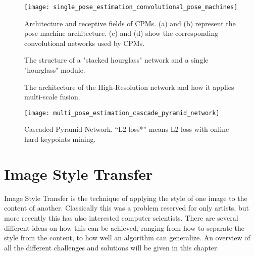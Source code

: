 \begin{figure}
	\centering
	\texttt{[image: single\_pose\_estimation\_convolutional\_pose\_machines]}%
	\caption{
		Architecture and receptive fields of \gls{CPMs}. (a) and (b) represent the pose machine architecture.\cite{Ramakrishna2014}
		(c) and (d) show the corresponding convolutional networks used by \gls{CPMs}.\cite{Wei2016}
	}
	\label{fig:convolutional_pose_machines}
\end{figure}

\begin{figure}
	\centering
	\caption{
		The structure of a "stacked hourglass" network and a single "hourglass" module.\cite{Newell2016}
	}
	\label{fig:stacked_hourglass}
\end{figure}

\begin{figure}
	\centering
	\caption{
		The architecture of the High-Resolution network and how it applies multi-scale fusion.\cite{Sun2019}
	}
	\label{fig:HRNet}
\end{figure}

\begin{figure}
	\centering
	\texttt{[image: multi\_pose\_estimation\_cascade\_pyramid\_network]}%
	\caption{
		Cascaded Pyramid Network. “L2 loss*” means L2 loss with online hard keypoints mining.\cite{Chen2017}
	}
	\label{fig:cascade_pyramid_network}
\end{figure}

\section{Image Style Transfer}
Image Style Transfer is the technique of applying the style of one image to the content of another.
Classically this was a problem reserved for only artists, but more recently this has also interested computer scientists.
There are several different ideas on how this can be achieved,
ranging from how to separate the style from the content, to how well an algorithm can generalize.
An overview of all the different challenges and solutions will be given in this chapter.

